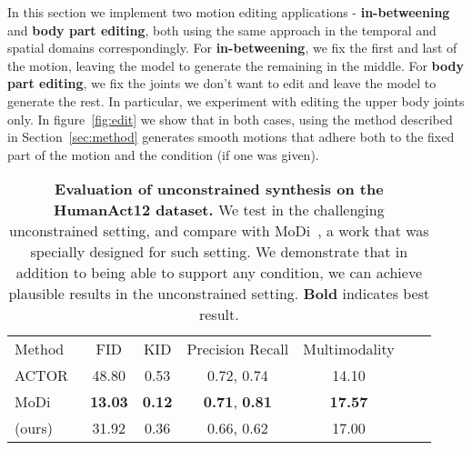 In this section we implement two motion editing applications - \textbf{in-betweening} and \textbf{body part editing}, both using the same approach in the temporal and spatial domains correspondingly. 
For \textbf{in-betweening}, we fix the first and last  of the motion, leaving the model to generate the remaining  in the middle. For \textbf{body part editing}, we fix the joints we don't want to edit and leave the model to generate the rest. In particular, we experiment with editing the upper body joints only.
In figure~\ref{fig:edit} we show that in both cases, using the method described in Section~\ref{sec:method} generates smooth motions that adhere both to the fixed part of the motion and the condition (if one was given).




\begin{table}[tbh]
\centering


\small

    \begin{tabular}{lcccccc}
    \toprule
    
    \multirow{2}{2cm}{\centering Method} & 
    \multirow{2}{1.5cm}{\centering FID} &
    \multirow{2}{2cm}{\centering KID} &
    \multirow{2}{2cm}{\centering Precision Recall} &
    \multirow{2}{2cm}{\centering Multimodality} \\
    \\

    \midrule

    ACTOR~\citeyearpar{petrovich21actor} & 48.80 & 0.53 & 0.72,   0.74 & 14.10 \\ 

    MoDi~\citeyearpar{raab2022modi} & \textbf{13.03} & \textbf{0.12} & \textbf{0.71},   \textbf{0.81} & \textbf{17.57}\\ 
    
    \midrule

    \ourmethod{} (ours)  & 31.92 & 0.36 & 0.66, 0.62 & 17.00\\  

    \bottomrule
    \end{tabular}
\caption{\textbf{Evaluation of unconstrained synthesis on the HumanAct12 dataset.} We test \ourmethod{} in the challenging unconstrained setting, and compare with MoDi~\citep{raab2022modi}, a work that was specially designed for such setting. We demonstrate that in addition to being able to support any condition, we can achieve plausible results in the unconstrained setting.
\textbf{Bold} indicates best result.}
\label{tab:unconstrained}
\end{table}
 \vspace{-5pt}
